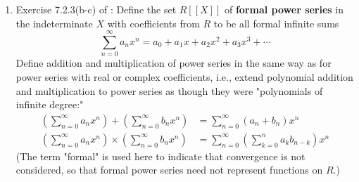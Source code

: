 \documentclass[../psets.tex]{subfiles}
\begin{document}
\begin{enumerate}
\begin{proof}
        \begin{equation*}
            a = 1_Ra = a1_R
        \end{equation*}
        where the second equality above gives the desired result.\par\smallskip
        As defined in Exercise 7.1.7 of \textcite{bib:DummitFoote}, the center of $R$ is the set
        \begin{equation*}
            Z(R) = \{z\in R\mid zr=rz\ \forall\ r\in R\}
        \end{equation*}
        We will prove that
        \begin{equation*}
            Z(R) = \bigcap_{a\in R}C(a)
        \end{equation*}
        via a bidirectional inclusion proof. Suppose first that $z\in Z(R)$. To confirm that $z\in\bigcap_{a\in R}C(a)$, it will suffice to determine if $z\in C(a)$ for all $a\in R$. Let $a\in R$ be arbitrary. By the definition of $Z(R)$, $za=az$. Thus, by the definition of $C(a)$, $z\in C(a)$, as desired. Now suppose that $z\in\bigcap_{a\in R}C(a)$. To confirm that $z\in Z(R)$, it will suffice to determine if $zr=rz$ for all $r\in R$. Let $r\in R$ be arbitrary. By hypothesis, $z\in C(r)$. Thus, $zr=rz$, as desired.
    \end{proof}
    \item Exercise 7.2.3(b-c) of \textcite{bib:DummitFoote}: Define the set $R[[X]]$ of \textbf{formal power series} in the indeterminate $X$ with coefficients from $R$ to be all formal infinite sums
    \begin{equation*}
        \sum_{n=0}^\infty a_nx^n = a_0+a_1x+a_2x^2+a_3x^3+\cdots
    \end{equation*}
    Define addition and multiplication of power series in the same way as for power series with real or complex coefficients, i.e., extend polynomial addition and multiplication to power series as though they were "polynomials of infinite degree:"
    \begin{align*}
        \left( \sum_{n=0}^\infty a_nx^n \right)+\left( \sum_{n=0}^\infty b_nx^n \right) &= \sum_{n=0}^\infty(a_n+b_n)x^n\\
        \left( \sum_{n=0}^\infty a_nx^n \right)\times\left( \sum_{n=0}^\infty b_nx^n \right) &= \sum_{n=0}^\infty\left( \sum_{k=0}^na_kb_{n-k} \right)x^n
    \end{align*}
    (The term "formal" is used here to indicate that convergence is not considered, so that formal power series need not represent functions on $R$.)
    \begin{enumerate}[start=2,label={\textbf{(\alph*)}}]

\end{enumerate}
\end{enumerate}
\end{document}
